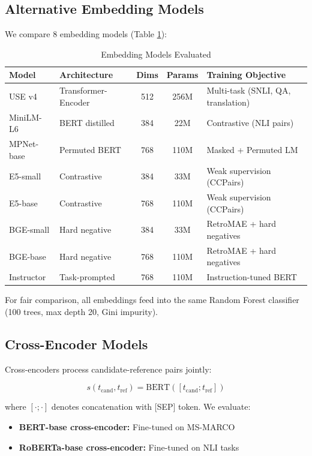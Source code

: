 \documentclass[11pt,a4paper]{article}
\begin{document}
\subsection{Alternative Embedding Models}

We compare 8 embedding models (Table \ref{tab:embeddings}):

\begin{table}[t]
\centering
\small
\caption{Embedding Models Evaluated}
\label{tab:embeddings}
\begin{tabular}{llccl}
\toprule
\textbf{Model} & \textbf{Architecture} & \textbf{Dims} & \textbf{Params} & \textbf{Training Objective} \\
\midrule
USE v4 & Transformer-Encoder & 512 & 256M & Multi-task (SNLI, QA, translation) \\
MiniLM-L6 & BERT distilled & 384 & 22M & Contrastive (NLI pairs) \\
MPNet-base & Permuted BERT & 768 & 110M & Masked + Permuted LM \\
E5-small & Contrastive & 384 & 33M & Weak supervision (CCPairs) \\
E5-base & Contrastive & 768 & 110M & Weak supervision (CCPairs) \\
BGE-small & Hard negative & 384 & 33M & RetroMAE + hard negatives \\
BGE-base & Hard negative & 768 & 110M & RetroMAE + hard negatives \\
Instructor & Task-prompted & 768 & 110M & Instruction-tuned BERT \\
\bottomrule
\end{tabular}
\end{table}

For fair comparison, all embeddings feed into the same Random Forest classifier (100 trees, max depth 20, Gini impurity).

\subsection{Cross-Encoder Models}

Cross-encoders process candidate-reference pairs jointly:

\begin{equation}
s(t_{\text{cand}}, t_{\text{ref}}) = \text{BERT}([t_{\text{cand}}; t_{\text{ref}}])
\end{equation}

where $[\cdot;\cdot]$ denotes concatenation with [SEP] token. We evaluate:

\begin{itemize}
    \item \textbf{BERT-base cross-encoder:} Fine-tuned on MS-MARCO \cite{Nguyen2016MSMARCO}
    \item \textbf{RoBERTa-base cross-encoder:} Fine-tuned on NLI tasks
\end{itemize}
\end{document}
